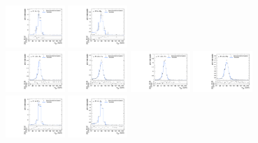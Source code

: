 \begin{figure}[htpb]
  \includegraphics[width=0.2\textwidth]{fig/analysisAppendix/templateVsReco_VBFGbuToWW2000_r0_MJ_mu_HP_bb_HDy.pdf}
  \includegraphics[width=0.2\textwidth]{fig/analysisAppendix/templateVsReco_VBFGbuToWW2000_r0_MJ_mu_LP_bb_HDy.pdf}\\
  \includegraphics[width=0.2\textwidth]{fig/analysisAppendix/templateVsReco_VBFGbuToWW2000_r0_MJ_mu_HP_nobb_LDy.pdf}
  \includegraphics[width=0.2\textwidth]{fig/analysisAppendix/templateVsReco_VBFGbuToWW2000_r0_MJ_mu_LP_nobb_LDy.pdf}
  \includegraphics[width=0.2\textwidth]{fig/analysisAppendix/templateVsReco_VBFGbuToWW2000_r0_MJ_mu_HP_nobb_HDy.pdf}
  \includegraphics[width=0.2\textwidth]{fig/analysisAppendix/templateVsReco_VBFGbuToWW2000_r0_MJ_mu_LP_nobb_HDy.pdf}\\
  \includegraphics[width=0.2\textwidth]{fig/analysisAppendix/templateVsReco_VBFGbuToWW2000_r0_MJ_mu_HP_vbf_LDy.pdf}
  \includegraphics[width=0.2\textwidth]{fig/analysisAppendix/templateVsReco_VBFGbuToWW2000_r0_MJ_mu_LP_vbf_LDy.pdf}

\end{figure}
